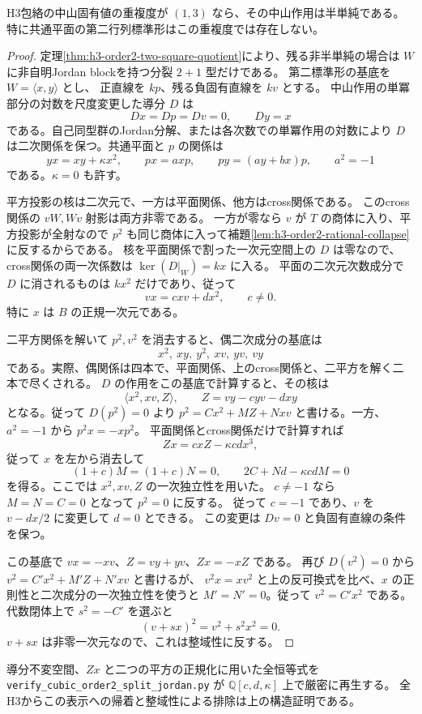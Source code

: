 \begin{theorem}[負三次元側の中山作用は半単純]
\label{thm:h3-order2-negative-three-semisimple}
H3包絡の中山固有値の重複度が $(1,3)$ なら、その中山作用は半単純である。
特に共通平面の第二行列標準形はこの重複度では存在しない。
\end{theorem}
\begin{proof}
定理\ref{thm:h3-order2-two-square-quotient}により、残る非半単純の場合は
$W$ に非自明Jordan blockを持つ分裂 $2+1$ 型だけである。
第二標準形の基底を $W=\langle x,y\rangle$ とし、
正直線を $kp$、残る負固有直線を $kv$ とする。
中山作用の単冪部分の対数を尺度変更した導分 $D$ は
\[
 Dx=Dp=Dv=0,\qquad Dy=x
\]
である。自己同型群のJordan分解、または各次数での単冪作用の対数により
$D$ は二次関係を保つ。共通平面と $p$ の関係は
\[
 yx=xy+\kappa x^2,\qquad px=a xp,\qquad
 py=(a y+b x)p,\qquad a^2=-1
\]
である。$\kappa=0$ も許す。

平方投影の核は二次元で、一方は平面関係、他方はcross関係である。
このcross関係の $vW,Wv$ 射影は両方非零である。
一方が零なら $v$ が $T$ の商体に入り、平方投影が全射なので
$p^2$ も同じ商体に入って補題\ref{lem:h3-order2-rational-collapse}に反するからである。
核を平面関係で割った一次元空間上の $D$ は零なので、
cross関係の両一次係数は $\ker(D|_W)=kx$ に入る。
平面の二次元次数成分で $D$ に消されるものは $kx^2$ だけであり、従って
\[
 vx=c xv+d x^2,\qquad c\ne0.
\]
特に $x$ は $B$ の正規一次元である。

二平方関係を解いて $p^2,v^2$ を消去すると、偶二次成分の基底は
\[
 x^2,\ xy,\ y^2,\ xv,\ yv,\ vy
\]
である。実際、偶関係は四本で、平面関係、上のcross関係と、二平方を解く二本で尽くされる。
$D$ の作用をこの基底で計算すると、その核は
\[
 \langle x^2,xv,Z\rangle,\qquad Z=vy-cyv-dxy
\]
となる。従って $D(p^2)=0$ より
$p^2=Cx^2+MZ+Nxv$ と書ける。一方、$a^2=-1$ から $p^2x=-xp^2$。
平面関係とcross関係だけで計算すれば
\[
 Zx=cxZ-\kappa cd x^3,
\]
従って $x$ を左から消去して
\[
 (1+c)M=(1+c)N=0,\qquad 2C+Nd-\kappa cdM=0
\]
を得る。ここでは $x^2,xv,Z$ の一次独立性を用いた。
$c\ne-1$ なら $M=N=C=0$ となって $p^2=0$ に反する。
従って $c=-1$ であり、$v$ を $v-dx/2$ に変更して $d=0$ とできる。
この変更は $Dv=0$ と負固有直線の条件を保つ。

この基底で $vx=-xv$、$Z=vy+yv$、$Zx=-xZ$ である。
再び $D(v^2)=0$ から $v^2=C'x^2+M'Z+N'xv$ と書けるが、
$v^2x=xv^2$ と上の反可換式を比べ、$x$ の正則性と二次成分の一次独立性を使うと
$M'=N'=0$。従って $v^2=C'x^2$ である。
代数閉体上で $s^2=-C'$ を選ぶと
\[
 (v+sx)^2=v^2+s^2x^2=0.
\]
$v+sx$ は非零一次元なので、これは整域性に反する。
\end{proof}
導分不変空間、$Zx$ と二つの平方の正規化に用いた全恒等式を
\texttt{verify\_\allowbreak{}cubic\_\allowbreak{}order2\_\allowbreak{}split\_\allowbreak{}jordan.py}
が $\mathbb Q[c,d,\kappa]$ 上で厳密に再生する。
全H3からこの表示への帰着と整域性による排除は上の構造証明である。

